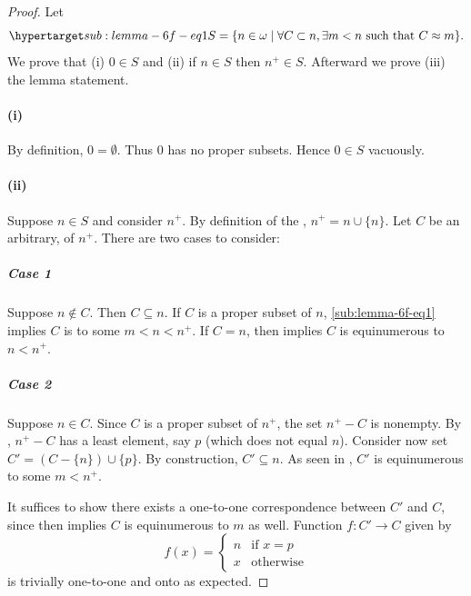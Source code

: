 \documentclass{report}
\begin{document}
  \begin{proof}

    Let
      \begin{equation}
        \hyperlabel{sub:lemma-6f-eq1}
        S = \{n \in \omega \mid \forall C \subset n,
          \exists m < n \text{ such that } \equinumerous{C}{m}\}.
      \end{equation}
    We prove that (i) $0 \in S$ and (ii) if $n \in S$ then $n^+ \in S$.
    Afterward we prove (iii) the lemma statement.

    \paragraph{(i)}%

      By definition, $0 = \emptyset$.
      Thus $0$ has no proper subsets.
      Hence $0 \in S$ vacuously.

    \paragraph{(ii)}%

      Suppose $n \in S$ and consider $n^+$.
      By definition of the , $n^+ = n \cup \{n\}$.
      Let $C$ be an arbitrary,  of $n^+$.
      There are two cases to consider:

      \subparagraph{Case 1}%

        Suppose $n \not\in C$.
        Then $C \subseteq n$.
        If $C$ is a proper subset of $n$, \eqref{sub:lemma-6f-eq1} implies $C$
          is  to some $m < n < n^+$.
        If $C = n$, then  implies $C$ is equinumerous to
          $n < n^+$.

      \subparagraph{Case 2}%

        Suppose $n \in C$.
        Since $C$ is a proper subset of $n^+$, the set $n^+ - C$ is nonempty.
        By , $n^+ - C$ has a least
          element, say $p$ (which does not equal $n$).
        Consider now set $C' = (C - \{n\}) \cup \{p\}$.
        By construction, $C' \subseteq n$.
        As seen in , $C'$ is equinumerous to some
          $m < n^+$.

        It suffices to show there exists a one-to-one correspondence between
          $C'$ and $C$, since then  implies $C$ is
          equinumerous to $m$ as well.
        Function $f \colon C' \rightarrow C$ given by
          $$f(x) = \begin{cases}
            n & \text{if } x = p \\
            x & \text{otherwise}
          \end{cases}$$
          is trivially one-to-one and onto as expected.


\end{proof}
\end{document}
